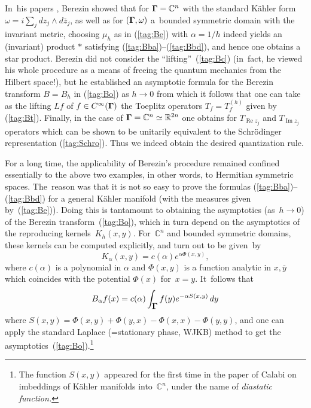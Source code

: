 \documentclass[11pt]{amsart}
\numberwithin{equation}{section}
\theoremstyle{remark}
\newcommand\into{\int_\Omg}
\newcommand\Omg{{\bigam}}   %
\newcommand\RR{\mathbb R}
\newcommand{\CC}{\C}
\newcommand{\bigam}{\mbox{\boldmath $\Gamma$}}
\newcommand{\C}{\mathbb C}
\begin{document}
In~his papers \cite{bib:Berez}, Berezin showed that for $\Omg=\CC^n$ with the
standard K\"ahler form $\omega= i \sum_j dz_j\wedge d\overline z_j$, as
well as for $(\Omg,\omega)$ a~bounded symmetric domain with the invariant
metric, choosing $\mu_h$ as in (\ref{tag:Be}) with $\alpha=1/h$ indeed yields
an (invariant) product $*$ satisfying (\ref{tag:Bba})--(\ref{tag:Bbd}), and
hence one obtains a star product. Berezin did not consider the
``lifting''~(\ref{tag:Bc}) (in~fact, he viewed his whole procedure as a means
of freeing the quantum mechanics from the Hilbert space!), but he established
an asymptotic formula for the Berezin transform $B=B_h$ in (\ref{tag:Bo}) as
$h\to0$ from which it follows that one can take as the lifting $Lf$ of $f\in
C^\infty(\Omg)$ the Toeplitz operators $T_f=T^{(h)}_f$ given by
(\ref{tag:Bt}). Finally, in the case of $\Omg=\CC^n\simeq\RR^{2n}$ one
obtains for $T_{\operatorname{Re}z_j}$ and $T_{\operatorname{Im}z_j}$ operators
which can be shown to be unitarily equivalent to the Schr\"odinger
representation (\ref{tag:Schro}). Thus we indeed obtain the desired
quantization rule.

For a long time, the applicability of Berezin's procedure remained confined
essentially to the above two examples, in other words, to Hermitian symmetric
spaces. The~reason was that it is not so easy to prove the formulas
(\ref{tag:Bba})--(\ref{tag:Bbd}) for a general K\"ahler manifold (with the
measures given  by~(\ref{tag:Be})). Doing this is tantamount to obtaining the
asymptotics (as~$h\to0$) of the Berezin transform~(\ref{tag:Bo}), which in turn
depend on the asymptotics of the reproducing kernels~$K_h(x,y)$. For~$\CC^n$
and bounded symmetric domains, these kernels can be computed explicitly, and
turn out to be given~by \begin{equation}  K_\alpha(x,y) = c(\alpha)
e^{\alpha\Phi(x,y)},  \label{tag:Bf}  \end{equation}  where $c(\alpha)$ is a
polynomial in $\alpha$ and $\Phi(x,y)$ is a function analytic in $x,\overline
y$ which coincides with the potential $\Phi(x)$ for~$x=y$. It~follows that
$$ B_\alpha f(x) = c(\alpha) \into f(y) e^{-\alpha S(x,y)} \, dy  $$
where $S(x,y)=\Phi(x,y)+\Phi(y,x)-\Phi(x,x)-\Phi(y,y)$, and one can apply the
standard Laplace (=stationary phase, WJKB) method to get the
asymptotics~(\ref{tag:Bo}).\footnote{The function $S(x,y)$ appeared for the
first time in the paper of Calabi \cite{bib:+Calabi} on imbeddings of K\"ahler
manifolds into~$\CC^n$, under the name of {\sl diastatic function.}}
\end{document}

